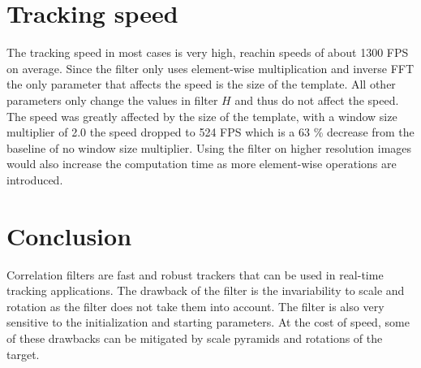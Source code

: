 \documentclass[9pt]{IEEEtran}
\begin{document}
\section{Tracking speed}
The tracking speed in most cases is very high, reachin speeds of about 1300 FPS on average.
Since the filter only uses element-wise multiplication and inverse FFT the only parameter that affects the speed is the size of the template.
All other parameters only change the values in filter $H$ and thus do not affect the speed.
The speed was greatly affected by the size of the template, with a window size multiplier of 2.0 the speed dropped to 524 FPS which is a 63 \% decrease from the baseline of no window size multiplier. 
Using the filter on higher resolution images would also increase the computation time as more element-wise operations are introduced.

\section{Conclusion}
Correlation filters are fast and robust trackers that can be used in real-time tracking applications.
The drawback of the filter is the invariability to scale and rotation as the filter does not take them into account.
The filter is also very sensitive to the initialization and starting parameters.
At the cost of speed, some of these drawbacks can be mitigated by scale pyramids and rotations of the target. 




\end{document}
